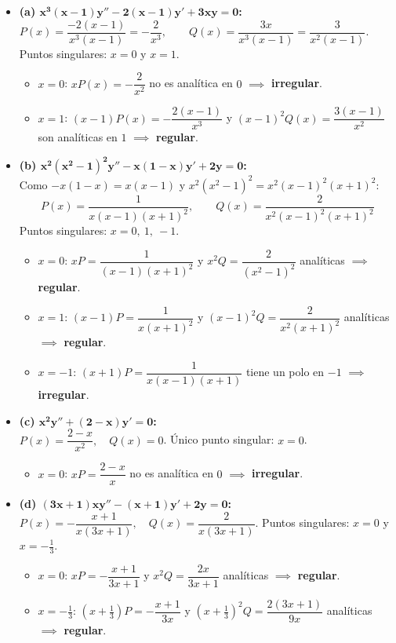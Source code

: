 \documentclass[11pt, a4paper]{article}
\begin{document}
\begin{itemize}
\item \textbf{(a) $\bm{x^3(x-1)y''-2(x-1)y'+3xy=0}$:} \\
$P(x)=\dfrac{-2(x-1)}{x^3(x-1)}=-\dfrac{2}{x^3}, \qquad Q(x)=\dfrac{3x}{x^3(x-1)}=\dfrac{3}{x^2(x-1)}$. Puntos singulares: $x=0$ y $x=1$.
\begin{itemize}
\item $x=0$: $xP(x)=-\dfrac{2}{x^2}$ no es analítica en $0$ $\implies$ \textbf{irregular}.
\item $x=1$: $(x-1)P(x)=-\dfrac{2(x-1)}{x^3}$ y $(x-1)^2Q(x)=\dfrac{3(x-1)}{x^2}$ son analíticas en $1$ $\implies$ \textbf{regular}.
\end{itemize}

\item \textbf{(b) $\bm{x^2(x^2-1)^2y''-x(1-x)y'+2y=0}$:} \\
Como $-x(1-x)=x(x-1)$ y $x^2(x^2-1)^2=x^2(x-1)^2(x+1)^2$:
\[
P(x)=\frac{1}{x(x-1)(x+1)^2}, \qquad Q(x)=\frac{2}{x^2(x-1)^2(x+1)^2}
\]
Puntos singulares: $x=0,\ 1,\ -1$.
\begin{itemize}
\item $x=0$: $xP=\dfrac{1}{(x-1)(x+1)^2}$ y $x^2Q=\dfrac{2}{(x^2-1)^2}$ analíticas $\implies$ \textbf{regular}.
\item $x=1$: $(x-1)P=\dfrac{1}{x(x+1)^2}$ y $(x-1)^2Q=\dfrac{2}{x^2(x+1)^2}$ analíticas $\implies$ \textbf{regular}.
\item $x=-1$: $(x+1)P=\dfrac{1}{x(x-1)(x+1)}$ tiene un polo en $-1$ $\implies$ \textbf{irregular}.
\end{itemize}

\item \textbf{(c) $\bm{x^2y''+(2-x)y'=0}$:} \\
$P(x)=\dfrac{2-x}{x^2}, \quad Q(x)=0$. Único punto singular: $x=0$.
\begin{itemize}
\item $x=0$: $xP=\dfrac{2-x}{x}$ no es analítica en $0$ $\implies$ \textbf{irregular}.
\end{itemize}

\item \textbf{(d) $\bm{(3x+1)xy''-(x+1)y'+2y=0}$:} \\
$P(x)=-\dfrac{x+1}{x(3x+1)}, \quad Q(x)=\dfrac{2}{x(3x+1)}$. Puntos singulares: $x=0$ y $x=-\tfrac13$.
\begin{itemize}
\item $x=0$: $xP=-\dfrac{x+1}{3x+1}$ y $x^2Q=\dfrac{2x}{3x+1}$ analíticas $\implies$ \textbf{regular}.
\item $x=-\tfrac13$: $(x+\tfrac13)P=-\dfrac{x+1}{3x}$ y $(x+\tfrac13)^2Q=\dfrac{2(3x+1)}{9x}$ analíticas $\implies$ \textbf{regular}.
\end{itemize}
\end{itemize}
\end{document}
